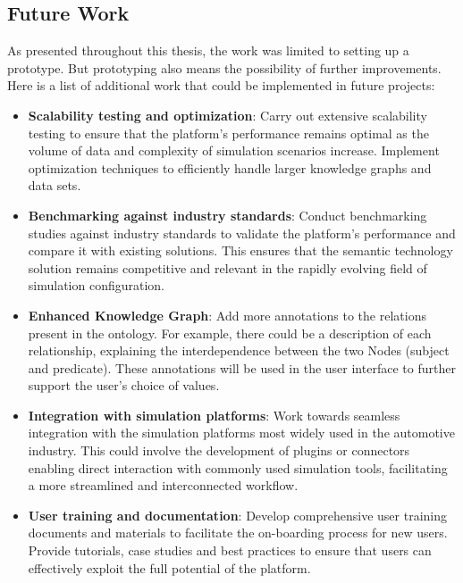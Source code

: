  
\subsection{Future Work}
As presented throughout this thesis, the work was limited to setting up a prototype. But prototyping also means the possibility of further improvements. Here is a list of additional work that could be implemented in future projects:

\begin{itemize}
    \item \textbf{Scalability testing and optimization}: Carry out extensive scalability testing to ensure that the platform's performance remains optimal as the volume of data and complexity of simulation scenarios increase. Implement optimization techniques to efficiently handle larger knowledge graphs and data sets.
    
    \item \textbf{Benchmarking against industry standards}: Conduct benchmarking studies against industry standards to validate the platform's performance and compare it with existing solutions. This ensures that the semantic technology solution remains competitive and relevant in the rapidly evolving field of simulation configuration.
    
    \item \textbf{Enhanced Knowledge Graph}: Add more annotations to the relations present in the ontology. For example, there could be a description of each relationship, explaining the interdependence between the two Nodes (subject and predicate). These annotations will be used in the user interface to further support the user's choice of values.
    
    \item \textbf{Integration with simulation platforms}: Work towards seamless integration with the simulation platforms most widely used in the automotive industry. This could involve the development of plugins or connectors enabling direct interaction with commonly used simulation tools, facilitating a more streamlined and interconnected workflow.
    
    \item \textbf{User training and documentation}: Develop comprehensive user training documents and materials to facilitate the on-boarding process for new users. Provide tutorials, case studies and best practices to ensure that users can effectively exploit the full potential of the platform.
\end{itemize}

